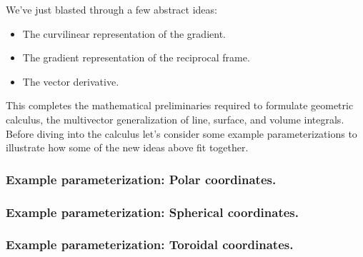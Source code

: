 %
%

We've just blasted through a few abstract ideas:
\begin{itemize}
\item The curvilinear representation of the gradient.
\item The gradient representation of the reciprocal frame.
\item The vector derivative.
\end{itemize}

This completes the
mathematical preliminaries required to formulate geometric calculus, the multivector generalization of line, surface, and volume integrals.
Before diving into the calculus let's consider some
example parameterizations to illustrate how some of the new ideas above fit together.

\subsubsection{Example parameterization: Polar coordinates.}
   

\subsubsection{Example parameterization: Spherical coordinates.}
   

\subsubsection{Example parameterization: Toroidal coordinates.}
   

